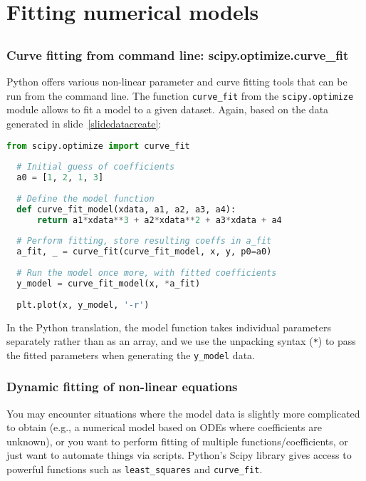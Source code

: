 \section{Fitting numerical models}
\subsection*{}
\begin{frame}[fragile]
  \frametitle{Curve fitting from command line: scipy.optimize.curve\_fit}
  Python offers various non-linear parameter and curve fitting tools that can be run from the command line. The function \lstinline$curve_fit$ from the \lstinline$scipy.optimize$ module allows to fit a model to a given dataset. Again, based on the data generated in slide~\ref{slidedatacreate}:
    \begin{lstlisting}[language=Python]
  from scipy.optimize import curve_fit
  
  # Initial guess of coefficients
  a0 = [1, 2, 1, 3]
  
  # Define the model function
  def curve_fit_model(xdata, a1, a2, a3, a4):
      return a1*xdata**3 + a2*xdata**2 + a3*xdata + a4
  
  # Perform fitting, store resulting coeffs in a_fit
  a_fit, _ = curve_fit(curve_fit_model, x, y, p0=a0)
  
  # Run the model once more, with fitted coefficients
  y_model = curve_fit_model(x, *a_fit)
  
  plt.plot(x, y_model, '-r')
    \end{lstlisting}
    In the Python translation, the model function takes individual parameters separately rather than as an array, and we use the unpacking syntax (\lstinline$*$) to pass the fitted parameters when generating the \lstinline$y_model$ data.
  \end{frame}
  

\begin{frame}[fragile] 
  \frametitle{Dynamic fitting of non-linear equations}
  You may encounter situations where the model data is slightly more complicated to obtain (e.g., a numerical model based on ODEs where coefficients are unknown), or you want to perform fitting of multiple functions/coefficients, or just want to automate things via scripts. Python's Scipy library gives access to powerful functions such as \lstinline$least_squares$ and \lstinline$curve_fit$.
  \end{frame}
  

